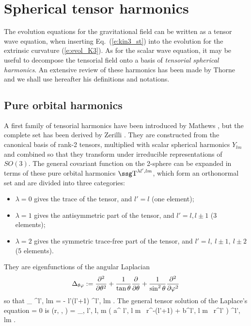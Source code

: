 %
%
\chapter{Spherical tensor harmonics}
The evolution equations for the gravitational field can be written as
a tensor wave equation, when inserting Eq.~(\ref{e:kin3_st}) into the
evolution for the extrinsic curvature (\ref{e:evol_K3}). As for the
scalar wave equation, it may be useful to decompose the tensorial
field onto a basis of {\em tensorial spherical harmonics}. An extensive
review of these harmonics has been made by Thorne \cite{Thorn80} and we
shall use hereafter his definitions and notations.

\section{Pure orbital harmonics}

A first family of tensorial harmonics have been introduced by Mathews
\cite{Mathe62}, but the
complete set has been derived by Zerilli \cite{Zeril70}.
They are constructed from the canonical basis of rank-2 tensors,
multiplied with scalar spherical harmonics $Y_{lm}$ and combined so that they
transform under irreducible representations of $SO(3)$. The general
covariant function on the 2-sphere can be expanded in terms of these pure
orbital harmonics $\w{T}^{\lambda l', lm}$, which form an
orthonormal set and are divided into three categories:
\begin{itemize}
\item $\lambda=0$ gives the trace of the tensor, and $l'=l$ (one element);
\item $\lambda = 1$ gives the antisymmetric part of the tensor, and
$l'=l, l\pm1$ (3 elements);
\item $\lambda=2$ gives the symmetric trace-free part of the tensor,
and $l'=l,\  l\pm 1,\ l\pm 2 $ (5 elements).
\end{itemize}
They are eigenfunctions of the angular Laplacian 
$$
\Delta_{\theta\varphi} := \frac{\partial^2 }{\partial \theta ^2} +{1\over\tan\theta} \frac{\partial }{\partial \theta}
	+ {1\over\sin^2\theta}\frac{\partial^2 }{\partial \varphi ^2}
$$
so that 
\be
\Delta_{\th\ph} ^{\lambda l', lm} = - l'(l'+1) ^{\lambda l',
lm} . 
\ee
The general tensor solution of the Laplace's equation
\be
\Delta {} = 0
\ee
is 
\be
{}(r, \th, \ph) = \sum_{\lambda, l', l, m} \left( a^{\lambda
l', l m} \, r^{-(l'+1)} + b^{\lambda l', l m} \, r^{l'} \right)
^{\lambda l', lm} .
\ee

